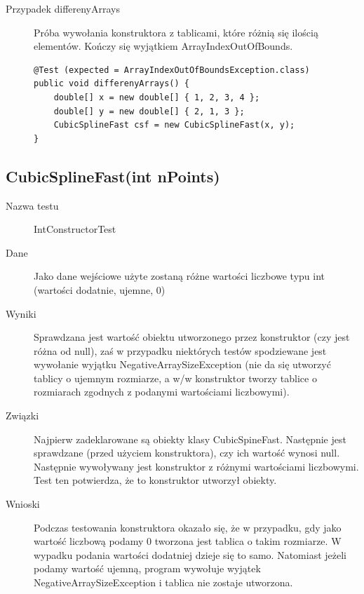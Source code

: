 \documentclass[12pt,a4paper,notitlepage]{article}
\begin{document}
\begin{description}
\item [Przypadek differenyArrays] Próba wywołania konstruktora z tablicami, które różnią się ilością elementów. Kończy się wyjątkiem ArrayIndexOutOfBounds.

\begin{lstlisting}
@Test (expected = ArrayIndexOutOfBoundsException.class)
public void differenyArrays() {
    double[] x = new double[] { 1, 2, 3, 4 };
    double[] y = new double[] { 2, 1, 3 };
    CubicSplineFast csf = new CubicSplineFast(x, y);
}
\end{lstlisting}

\end{description}

\subsection{CubicSplineFast(int nPoints)}
\begin{description}
\item [Nazwa testu] IntConstructorTest
\item [Dane] Jako dane wejściowe użyte zostaną różne wartości liczbowe typu int (wartości dodatnie, ujemne, 0)
\item [Wyniki] Sprawdzana jest wartość obiektu utworzonego przez konstruktor (czy jest różna od null), zaś w przypadku niektórych testów spodziewane jest wywołanie wyjątku NegativeArraySizeException (nie da się utworzyć tablicy o ujemnym rozmiarze, a w/w konstruktor tworzy tablice o rozmiarach zgodnych z podanymi wartościami liczbowymi).
\item [Związki] Najpierw zadeklarowane są obiekty klasy CubicSpineFast. Następnie jest sprawdzane (przed użyciem konstruktora), czy ich wartość wynosi null. Następnie wywoływany jest konstruktor z różnymi wartościami liczbowymi. Test ten potwierdza, że to konstruktor utworzył obiekty.
\item [Wnioski] Podczas testowania konstruktora okazało się, że w przypadku, gdy jako wartość liczbową podamy 0 tworzona jest tablica o takim rozmiarze. W wypadku podania wartości dodatniej dzieje się to samo. Natomiast jeżeli podamy wartość ujemną, program wywołuje wyjątek NegativeArraySizeException i tablica nie zostaje utworzona.
\end{description}
\vspace*{5mm}
\end{document}
